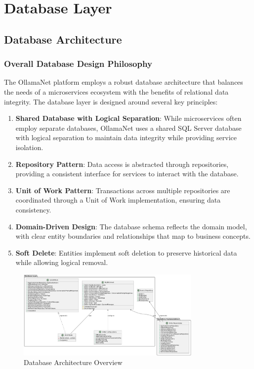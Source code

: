 \def\chapdir{./Chapter05}

\chapter{Database Layer} \label{ch:database-layer}

\section{Database Architecture}

\subsection{Overall Database Design Philosophy}

The OllamaNet platform employs a robust database architecture that balances the needs of a microservices ecosystem with the benefits of relational data integrity. The database layer is designed around several key principles:

\begin{enumerate}
   \item \textbf{Shared Database with Logical Separation}: While microservices often employ separate databases, OllamaNet uses a shared SQL Server database with logical separation to maintain data integrity while providing service isolation.

   \item \textbf{Repository Pattern}: Data access is abstracted through repositories, providing a consistent interface for services to interact with the database.

   \item \textbf{Unit of Work Pattern}: Transactions across multiple repositories are coordinated through a Unit of Work implementation, ensuring data consistency.

   \item \textbf{Domain-Driven Design}: The database schema reflects the domain model, with clear entity boundaries and relationships that map to business concepts.

   \item \textbf{Soft Delete}: Entities implement soft deletion to preserve historical data while allowing logical removal.
\end{enumerate}

\begin{figure}
    \centering
    \includegraphics[width=0.8\textwidth]{./Chapter05/figures/database_architecture.png}
    \caption{Database Architecture Overview}
    \label{fig:database-architecture}
\end{figure}

